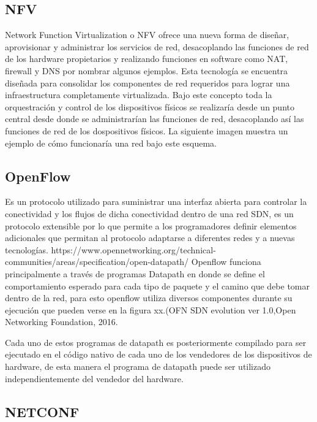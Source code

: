 \subsection{NFV}
\label{sec:NFV}

Network Function Virtualization o NFV ofrece una nueva forma de diseñar, aprovisionar y administrar los servicios de red, desacoplando las funciones de red de los hardware propietarios y realizando funciones en software como NAT, firewall y DNS por nombrar algunos ejemplos. Esta tecnología se encuentra diseñada para consolidar los componentes de red requeridos para lograr una infraestructura completamente virtualizada.
Bajo este concepto toda la orquestración y control de los dispositivos físicos se realizaría desde un punto central desde donde se administrarían las funciones de red, desacoplando así las funciones de red de los dospositivos físicos. La siguiente imagen muestra un ejemplo de cómo funcionaría una red bajo este esquema.


\subsection{OpenFlow}
\label{sec:OpenFlow}

Es un protocolo utilizado para suministrar una interfaz abierta para controlar la conectividad y los flujos de dicha conectividad dentro de una red SDN, es un protocolo extensible por lo que permite a los programadores definir elementos adicionales que permitan al protocolo adaptarse a diferentes redes y a nuevas tecnologías. https://www.opennetworking.org/technical-communities/areas/specification/open-datapath/
Openflow funciona principalmente a través de programas Datapath en donde se define el comportamiento esperado para cada tipo de paquete y el camino que debe tomar dentro de la red, para esto openflow utiliza diversos componentes durante su ejecución que pueden verse en la figura xx.(OFN SDN evolution ver 1.0,Open Networking Foundation, 2016.

Cada uno de estos programas de datapath es posteriormente compilado para ser ejecutado en el código nativo de cada uno de los vendedores de los dispositivos de hardware, de esta manera el programa de datapath puede ser utilizado independientemente del vendedor del hardware.


\subsection{NETCONF}
\label{sec:NETCONF}


